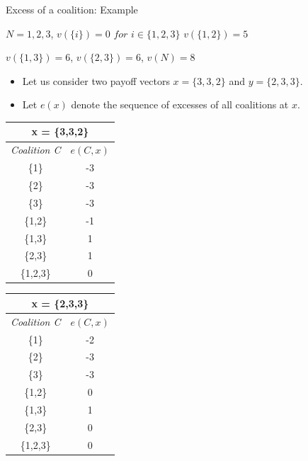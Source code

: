 \documentclass{beamer}
\begin{document}
\begin{frame}{Excess of a coalition: Example}

    \centerline{$N = {1,2,3}$, $v(\{i\})=0$ $for$ $i \in \{1,2,3\}$ $v(\{1,2\}) = 5$}
    \centerline{$v(\{1,3\}) = 6$, $v(\{2,3\}) = 6$, $v(N) = 8$}

     \begin{itemize}
        \item Let us consider two payoff vectors $x = \{3, 3,2\}$ and $y = \{2, 3,3\}$.
        \item Let $e(x)$ denote the sequence of excesses of all coalitions at $x$.
     \end{itemize}


     \begin{table}[!htb]
        \begin{minipage}{.5\linewidth}
          \centering
            \begin{tabular}{c|c}
                \multicolumn{2}{c}{x = \{3,3,2\}} \\
                \hline
                \emph{Coalition C} & $e(C,x)$\\
                \hline
                \{1\} & -3\\
                \{2\} & -3\\
                \{3\} & -3\\
                \{1,2\} & -1\\
                \{1,3\} & 1\\
                \{2,3\} & 1\\
                \{1,2,3\} & 0\\
            \end{tabular}
        \end{minipage}%
        \begin{minipage}{.5\linewidth}
          \centering
            \begin{tabular}{c|c}
                \multicolumn{2}{c}{x = \{2,3,3\}} \\
                \hline
                \emph{Coalition C} & $e(C,x)$\\
                \hline
                \{1\} & -2\\
                \{2\} & -3\\
                \{3\} & -3\\
                \{1,2\} & 0\\
                \{1,3\} & 1\\
                \{2,3\} & 0\\
                \{1,2,3\} & 0\\
            \end{tabular}
        \end{minipage}
    \end{table}

\end{frame}
\end{document}
